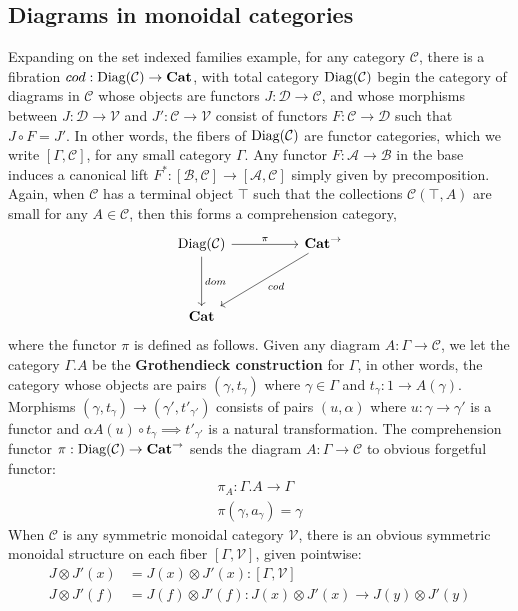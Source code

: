 \subsection{Diagrams in monoidal categories}
Expanding on the set indexed families example, for any category $\mathcal{C}$, there is a fibration $cod : \operatorname{\text{Diag}}(\mathcal{C}) \to \mathbf{Cat}$, with total category $\operatorname{\text{Diag}}(\mathcal{C})$ begin the category of diagrams in $\mathcal{C}$ whose objects are functors $J : \mathcal{D} \to \mathcal{C}$, and whose morphisms between $J : \mathcal{D} \to \mathcal{V}$ and $J' :\mathcal{C} \to \mathcal{V}$ consist of functors $F : \mathcal{C} \to \mathcal{D}$ such that $J \circ F = J'$. In other words, the fibers of $\operatorname{\text{Diag}}(\mathcal{C})$ are functor categories, which we write $[\Gamma, \mathcal{C}]$, for any small category $\Gamma$. Any functor $F : \mathcal{A} \to \mathcal{B}$ in the base induces a canonical lift $F^* : [\mathcal{B}, \mathcal{C}] \to [\mathcal{A},\mathcal{C}]$ simply given by precomposition.\\
Again, when $\mathcal{C}$ has a terminal object $\top$ such that the collections $\mathcal{C}(\top, A)$ are small for any $A \in \mathcal{C}$, then this forms a comprehension category,
\[
\ti
\diag(\mathcal{C}) \ar[d, "dom"] \ar[r,"\pi"] & \mathbf{Cat}^\to \ar[ld, "cod"] \\
\mathbf{Cat}
\kz
\]
 where the functor $\pi$ is defined as follows. Given any diagram $A : \Gamma \to \mathcal{C}$, we let the category $\Gamma.A$ be the \textbf{Grothendieck construction} for $\Gamma$, in other words, the category whose objects are pairs $(\gamma, t_\gamma)$ where $\gamma \in \Gamma$ and $t_\gamma : 1 \to A(\gamma)$. Morphisms $(\gamma, t_\gamma) \to (\gamma', t'_{\gamma'})$ consists of pairs $(u, \alpha)$ where $u : \gamma \to \gamma'$ is a functor and $\alpha A(u) \circ t_\gamma \implies t'_{\gamma'}$ is a natural transformation. The comprehension functor $\pi : \operatorname{\text{Diag}}(\mathcal{C}) \to \mathbf{Cat}^\to$ sends the diagram $A : \Gamma \to \mathcal{C}$ to obvious forgetful functor:
 \[
   \begin{split}
     \pi_A : \Gamma.A \to \Gamma\\
     \pi(\gamma, a_\gamma) = \gamma
     \end{split}
\]
When $\mathcal{C}$ is any symmetric monoidal category $\mathcal{V}$, there is an obvious symmetric monoidal structure on each fiber $[\Gamma, \mathcal{V}]$, given pointwise:
\[
  \begin{split}
    J \otimes J'(x) &= J(x) \otimes J'(x) : [\Gamma, \mathcal{V}]\\
    J \otimes J'(f) &= J(f) \otimes J'(f) : J(x) \otimes J'(x) \to J(y) \otimes J'(y)
  \end{split}
  \]
